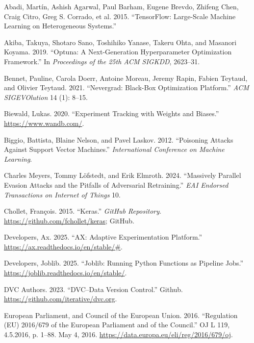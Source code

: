 \documentclass[
]{article}
\newlength{\cslhangindent}
\newlength{\cslentryspacingunit} %
\newenvironment{CSLReferences}[2] %
 {%
  \setlength{\parindent}{0pt}
  \ifodd #1
  \let\oldpar\par
  \def\par{\hangindent=\cslhangindent\oldpar}
  \fi
  \setlength{\parskip}{#2\cslentryspacingunit}
 }%
 {}
\begin{document}
\hypertarget{refs}{}
\begin{CSLReferences}{1}{0}
\leavevmode{}%
Abadi, Martín, Ashish Agarwal, Paul Barham, Eugene Brevdo, Zhifeng Chen,
Craig Citro, Greg S. Corrado, et al. 2015. {``{TensorFlow}: Large-Scale
Machine Learning on Heterogeneous Systems.''}

\leavevmode{}%
Akiba, Takuya, Shotaro Sano, Toshihiko Yanase, Takeru Ohta, and Masanori
Koyama. 2019. {``Optuna: A Next-Generation Hyperparameter Optimization
Framework.''} In \emph{Proceedings of the 25th ACM SIGKDD}, 2623--31.

\leavevmode{}%
Bennet, Pauline, Carola Doerr, Antoine Moreau, Jeremy Rapin, Fabien
Teytaud, and Olivier Teytaud. 2021. {``Nevergrad: Black-Box Optimization
Platform.''} \emph{ACM SIGEVOlution} 14 (1): 8--15.

\leavevmode{}%
Biewald, Lukas. 2020. {``Experiment Tracking with Weights and Biases.''}
\url{https://www.wandb.com/}.

\leavevmode{}%
Biggio, Battista, Blaine Nelson, and Pavel Laskov. 2012. {``Poisoning
Attacks Against Support Vector Machines.''} \emph{International
Conference on Machine Learning}.

\leavevmode{}%
Charles Meyers, Tommy Löfstedt, and Erik Elmroth. 2024. {``Massively
Parallel Evasion Attacks and the Pitfalls of Adversarial Retraining.''}
\emph{EAI Endorsed Transactions on Internet of Things} 10.

\leavevmode{}%
Chollet, François. 2015. {``Keras.''} \emph{GitHub Repository}.
\url{https://github.com/fchollet/keras}; GitHub.

\leavevmode{}%
Developers, Ax. 2025. {``AX: Adaptive Experimentation Platform.''}
\url{https://ax.readthedocs.io/en/stable/\#}.

\leavevmode{}%
Developers, Joblib. 2025. {``Joblib: Running Python Functions as
Pipeline Jobs.''} \url{https://joblib.readthedocs.io/en/stable/}.

\leavevmode{}%
DVC Authors. 2023. {``{DVC}--{Data Version Control}.''} Github.
\url{https://github.com/iterative/dvc.org}.

\leavevmode{}%
European Parliament, and Council of the European Union. 2016.
{``Regulation ({EU}) 2016/679 of the {European} {Parliament} and of the
{Council}.''} OJ L 119, 4.5.2016, p. 1--88. May 4, 2016.
\url{https://data.europa.eu/eli/reg/2016/679/oj}.


\end{CSLReferences}
\end{document}
